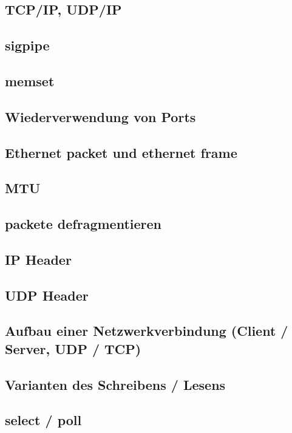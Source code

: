 \subsection{TCP/IP, UDP/IP}

\subsection{sigpipe}

\subsection{memset}

\subsection{Wiederverwendung von Ports}

\subsection{Ethernet packet und ethernet frame}

\subsection{MTU}

\subsection{packete defragmentieren}

\subsection{IP Header}

\subsection{UDP Header}

\subsection{Aufbau einer Netzwerkverbindung (Client / Server, UDP / TCP)}

\subsection{Varianten des Schreibens / Lesens}

\subsection{select / poll}